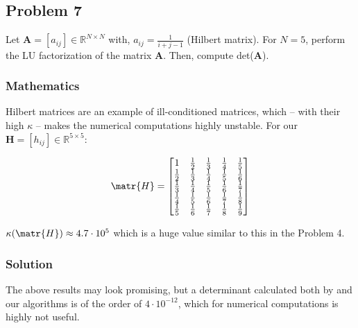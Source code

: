 \subsection{Problem 7}

Let $\mathbf{A} = \left[a_{ij}\right] \in\mathbb{R}^{N\times N}$ with, $a_{ij} = \frac{1}{i + j - 1}$ (Hilbert  matrix). For  $N=5$, perform  the LU factorization of the matrix $\mathbf{A}$. Then, compute det($\mathbf{A}$).
\subsubsection*{Mathematics}
Hilbert matrices are an example of ill-conditioned matrices, which -- with their high $\kappa$ -- makes the numerical computations highly unstable. For our  $\mathbf{H} = \left[h_{ij}\right] \in\mathbb{R}^{5\times 5}$:

\begin{equation*}
    \matr{H} = 
    \begin{bmatrix}
               1 & \frac{1}{2} & \frac{1}{3} & \frac{1}{4} & \frac{1}{5} \\
     \frac{1}{2} & \frac{1}{3} & \frac{1}{4} & \frac{1}{5} & \frac{1}{6} \\
     \frac{1}{3} & \frac{1}{4} & \frac{1}{5} & \frac{1}{6} & \frac{1}{7} \\
     \frac{1}{4} & \frac{1}{5} & \frac{1}{6} & \frac{1}{7} & \frac{1}{8} \\
     \frac{1}{5} & \frac{1}{6} & \frac{1}{7} & \frac{1}{8} & \frac{1}{9} 
    \end{bmatrix}
\end{equation*}

$\kappa(\matr{H})\approx4.7\cdot10^5$ which is a huge value similar to this in the Problem 4.
\subsubsection*{Solution}

The above results may look promising, but a determinant calculated both by \MATLAB and our algorithms is of the order of $4\cdot10^{-12}$, which for numerical computations is highly not useful.